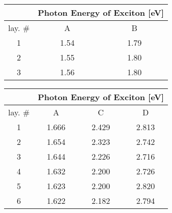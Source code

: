 \begin{minipage}[b]{0.4\textwidth}
    \begin{tabular}{c|cc|}
    \cline{2-3}
    \multicolumn{1}{l|}{}         & \multicolumn{2}{l|}{Photon Energy of  Exciton {[\si{\electronvolt}]}} \\ \hline
    \multicolumn{1}{|c|}{lay. \#} & \multicolumn{1}{c|}{A}                                        & B                                       \\ \hline
    \multicolumn{1}{|c|}{1}       & \multicolumn{1}{c|}{1.54}                                     & 1.79                                    \\ \hline
    \multicolumn{1}{|c|}{2}       & \multicolumn{1}{c|}{1.55}                                     & 1.80                                    \\ \hline
    \multicolumn{1}{|c|}{3}       & \multicolumn{1}{c|}{1.56}                                     & 1.80                                    \\ \hline
\end{tabular}
\label{tab:mose2_measurement_spectra}
\end{minipage}%
\hspace{0.1\textwidth}%
\begin{minipage}[b]{0.4\textwidth}
    \begin{tabular}{c|ccc|}
    \cline{2-4}
    \multicolumn{1}{l|}{}         & \multicolumn{3}{l|}{Photon Energy of  Exciton {[\si{\electronvolt}]}} \\ \hline
    \multicolumn{1}{|c|}{lay. \#} & \multicolumn{1}{c|}{A}                   & \multicolumn{1}{c|}{C}                  & D                  \\ \hline
    \multicolumn{1}{|c|}{1}       & \multicolumn{1}{c|}{1.666}               & \multicolumn{1}{c|}{2.429}              & 2.813              \\ \hline
    \multicolumn{1}{|c|}{2}       & \multicolumn{1}{c|}{1.654}               & \multicolumn{1}{c|}{2.323}              & 2.742              \\ \hline
    \multicolumn{1}{|c|}{3}       & \multicolumn{1}{c|}{1.644}               & \multicolumn{1}{c|}{2.226}              & 2.716              \\ \hline
    \multicolumn{1}{|c|}{4}       & \multicolumn{1}{c|}{1.632}               & \multicolumn{1}{c|}{2.200}              & 2.726              \\ \hline
    \multicolumn{1}{|c|}{5}       & \multicolumn{1}{c|}{1.623}               & \multicolumn{1}{c|}{2.200}              & 2.820              \\ \hline
    \multicolumn{1}{|c|}{6}       & \multicolumn{1}{c|}{1.622}               & \multicolumn{1}{c|}{2.182}              & 2.794              \\ \hline
\end{tabular}
\label{tab:wse2_measurement_spectra}
\end{minipage}
